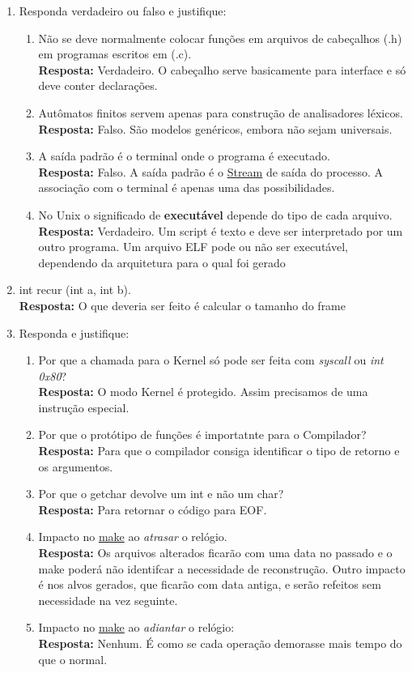 \documentclass[11pt]{article}
\author{miguel}
\date{\today}
\title{}
\begin{document}

\begin{enumerate}
\item Responda verdadeiro ou falso e justifique:
\begin{enumerate}
\item Não se deve normalmente colocar funções em arquivos de cabeçalhos (.h) em programas  escritos em (.c).\\
\textbf{Resposta:} Verdadeiro. O cabeçalho serve basicamente para interface e só deve conter declarações.
\item Autômatos finitos servem apenas para construção de analisadores léxicos.\\
\textbf{Resposta:} Falso. São modelos genéricos, embora não sejam universais.
\item A saída padrão é o terminal onde o programa é executado.\\
\textbf{Resposta:} Falso. A saída padrão é o \uline{Stream} de saída do processo. A associação com o terminal é apenas uma das possibilidades.
\item No Unix o significado de \textbf{executável} depende do tipo de cada arquivo.\\
\textbf{Resposta:} Verdadeiro. Um script é texto e deve ser interpretado por um outro programa. Um arquivo ELF pode ou não ser executável, dependendo da arquitetura para o qual foi gerado
\end{enumerate}
\item int recur (int a, int b).\\
\textbf{Resposta:} O que deveria ser feito é calcular o tamanho do frame
\item Responda e justifique:
\begin{enumerate}
\item Por que a chamada para o Kernel só pode ser feita com \emph{syscall} ou \emph{int 0x80}?\\
\textbf{Resposta:} O modo Kernel é protegido. Assim precisamos de uma instrução especial.
\item Por que o protótipo de funções é importatnte para o Compilador?\\
\textbf{Resposta:} Para que o compilador consiga identificar o tipo de retorno e os argumentos.
\item Por que o getchar devolve um int e não um char?\\
\textbf{Resposta:} Para retornar o código para EOF.
\item Impacto no \uline{make} ao \emph{atrasar} o relógio.\\
\textbf{Resposta:} Os arquivos alterados ficarão com uma data no passado e o make poderá não identifcar a necessidade de reconstrução. Outro impacto é nos alvos gerados, que ficarão com data antiga, e serão refeitos sem necessidade na vez seguinte.
\item Impacto no \uline{make} ao \emph{adiantar} o relógio:\\
\textbf{Resposta:} Nenhum. É como se cada operação demorasse mais tempo do que o normal.
\end{enumerate}
\end{enumerate}
\end{document}
